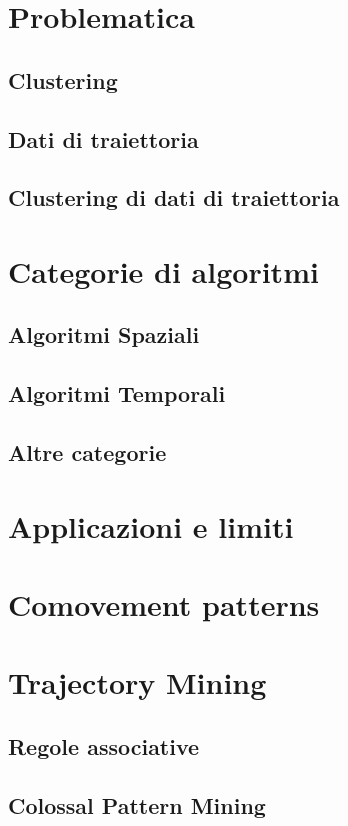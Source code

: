 
\section{Problematica}\label{sec:problem}


\subsection{Clustering}\label{subsec:clustering-problem}


\subsection{Dati di traiettoria}\label{subsec:trajectorydata-problem}


\subsection{Clustering di dati di traiettoria}\label{subsec:trajectoryclustering-problem}


\section{Categorie di algoritmi}\label{sec:categories}

\subsection{Algoritmi Spaziali}\label{subsec:spatialalgorithms}

\subsection{Algoritmi Temporali}\label{subsec:temporalalgorithms}

\subsection{Altre categorie}\label{subsec:othersalgorithms}

\section{Applicazioni e limiti}\label{sec:applicationandlimits}

\section{Comovement patterns}\label{sec:comovements-pattern}

\section{Trajectory Mining}\label{sec:trajectory-mining}

\subsection{Regole associative}\label{subsec:associative-rules}

\subsection{Colossal Pattern Mining}\label{subsec:colossal-data-mining}
